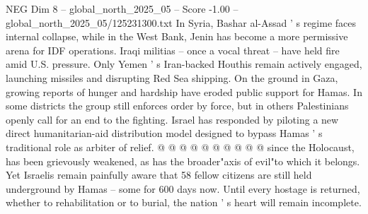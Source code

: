 \begin{textsample}{NEG Dim 8 – global\_north\_2025\_05 – Score -1.00 – global\_north\_2025\_05/125231300.txt}
In Syria, Bashar al-Assad ' s regime faces internal collapse, while in the West Bank, Jenin has become a more permissive arena for IDF operations.
Iraqi militias -- once a vocal threat -- have held fire amid U.S. pressure.
Only Yemen ' s Iran-backed Houthis remain actively engaged, launching missiles and disrupting Red Sea shipping.
On the ground in Gaza, growing reports of hunger and hardship have eroded public support for Hamas.
In some districts the group still enforces order by force, but in others Palestinians openly call for an end to the fighting.
Israel has responded by piloting a new direct humanitarian-aid distribution model designed to bypass Hamas ' s traditional role as arbiter of relief. @ @ @ @ @ @ @ @ @ @ since the Holocaust, has been grievously weakened, as has the broader"axis of evil"to which it belongs.
Yet Israelis remain painfully aware that 58 fellow citizens are still held underground by Hamas -- some for 600 days now.
Until every hostage is returned, whether to rehabilitation or to burial, the nation ' s heart will remain incomplete.

\end{textsample}
